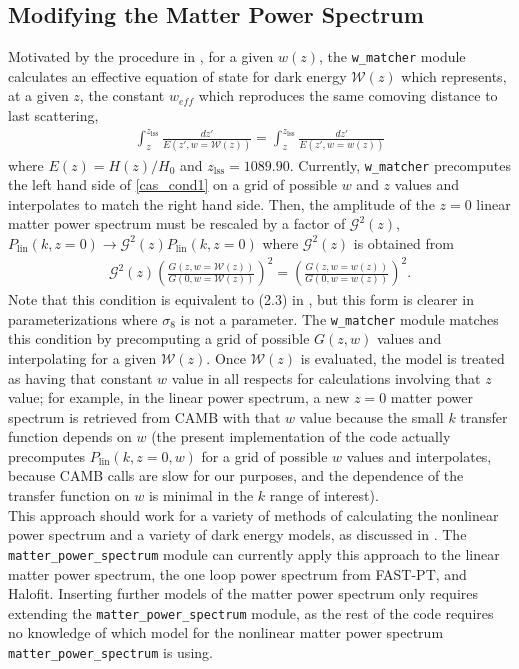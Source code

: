 \documentclass[a4paper,11pt]{article}
\begin{document}
\subsection{Modifying the Matter Power Spectrum}
\label{spec:modify_matter}
Motivated by the procedure in \cite{casarini_halofit_math}, for a given $w(z)$, the \texttt{w\_matcher} module calculates an effective equation of state for dark energy $\mathcal{W}(z)$ which represents, at a given $z$, the constant $w_{eff}$ which reproduces the same comoving distance to last scattering,
\begin{align}\label{cas_cond1}
\int_z^{z_{\text{lss}}}\frac{d z'}{E(z',w=\mathcal{W}(z))}=\int_z^{z_{\text{lss}}}\frac{d z'}{E(z',w=w(z))}
\end{align}
where $E(z)=H(z)/H_0$ and $z_{\text{lss}}=1089.90$. Currently, \texttt{w\_matcher} precomputes the left hand side of \eqref{cas_cond1} on a grid of possible $w$ and $z$ values and interpolates to match the right hand side. Then, the amplitude of the $z=0$ linear matter power spectrum must be rescaled by a factor of $\mathcal{G}^2(z)$, $P_{\text{lin}}(k,z=0)\rightarrow\mathcal{G}^2(z)P_{\text{lin}}(k,z=0)$ where $\mathcal{G}^2(z)$ is obtained from 
\begin{align}\label{cas_cond2}
\mathcal{G}^2(z)\left(\frac{G(z,w=\mathcal{W}(z))}{G(0,w=\mathcal{W}(z))}\right)^2=\left(\frac{G(z,w=w(z))}{G(0,w=w(z))}\right)^2.
\end{align}
Note that this condition is equivalent to (2.3) in \cite{casarini_halofit_math}, but this form is clearer in parameterizations where $\sigma_8$ is not a parameter. The \texttt{w\_matcher} module matches this condition by precomputing a grid of possible $G(z,w)$ values and interpolating for a given $\mathcal{W}(z)$. Once $\mathcal{W}(z)$ is evaluated, the model is treated as having that constant $w$ value in all respects for calculations involving that $z$ value; for example, in the linear power spectrum, a new $z=0$ matter power spectrum is retrieved from CAMB with that $w$ value because the small $k$ transfer function depends on $w$ (the present implementation of the code actually precomputes $P_{\text{lin}}(k,z=0,w)$ for a grid of possible $w$ values and interpolates, because CAMB calls are slow for our purposes, and the dependence of the transfer function on $w$ is minimal in the $k$ range of interest). 
\\
This approach should work for a variety of methods of calculating the nonlinear power spectrum and a variety of dark energy models, as discussed in \cite{casarini_halofit_2}. The \texttt{matter\_power\_spectrum} module can currently apply this approach to the linear matter power spectrum, the one loop power spectrum from FAST-PT, and Halofit. Inserting further models of the matter power spectrum only requires extending the \texttt{matter\_power\_spectrum} module, as the rest of the code requires no knowledge of which model for the nonlinear matter power spectrum \texttt{matter\_power\_spectrum} is using. 
\end{document}
